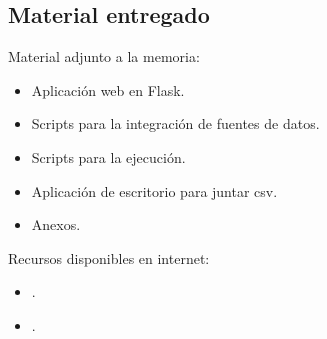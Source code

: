 \subsection{Material entregado}

Material adjunto a la memoria:

\begin{itemize}
	\item 
	Aplicación web en Flask.
	\item 
	Scripts para la integración de fuentes de datos.
	\item
	Scripts para la ejecución.
	\item 
	Aplicación de escritorio para juntar csv.
	\item 
	Anexos.
\end{itemize}

Recursos disponibles en internet:

\begin{itemize}
	\item 
	.
	\item
	.
\end{itemize}
